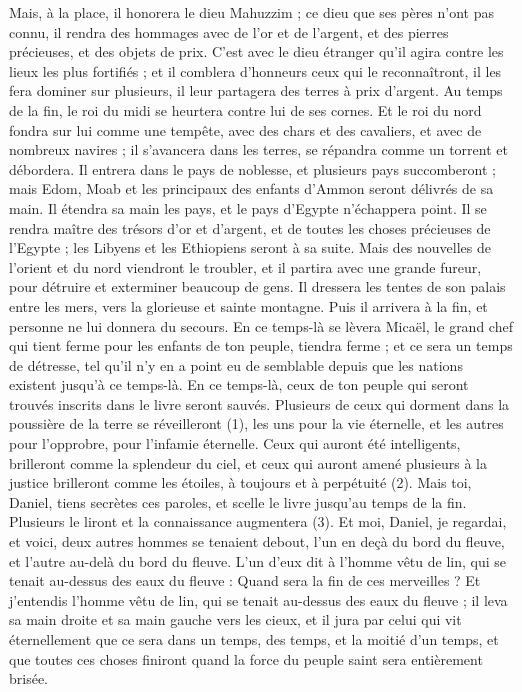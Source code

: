 \begin{multicols}{2}
Mais, à la place, il honorera le dieu Mahuzzim ; ce dieu que ses pères n'ont pas connu, il rendra des hommages avec de l'or et de l'argent, et des pierres précieuses, et des objets de prix.
C’est avec le dieu étranger qu’il agira contre les lieux les plus fortifiés ; et il comblera d’honneurs ceux qui le reconnaîtront, il les fera dominer sur plusieurs, il leur partagera des terres à prix d’argent.
Au temps de la fin, le roi du midi se heurtera contre lui de ses cornes. Et le roi du nord fondra sur lui comme une tempête, avec des chars et des cavaliers, et avec de nombreux navires ; il s’avancera dans les terres, se répandra comme un torrent et débordera.
Il entrera dans le pays de noblesse, et plusieurs pays succomberont ; mais Edom, Moab et les principaux des enfants d’Ammon seront délivrés de sa main.
Il étendra sa main les pays, et le pays d'Egypte n'échappera point.
Il se rendra maître des trésors d'or et d'argent, et de toutes les choses précieuses de l'Egypte ; les Libyens et les Ethiopiens seront à sa suite.
Mais des nouvelles de l'orient et du nord viendront le troubler, et il partira avec une grande fureur, pour détruire et exterminer beaucoup de gens.
Il dressera les tentes de son palais entre les mers, vers la glorieuse et sainte montagne. Puis il arrivera à la fin, et personne ne lui donnera du secours.
\VerseOne{}En ce temps-là se lèvera Micaël, le grand chef qui tient ferme pour les enfants de ton peuple, tiendra ferme ; et ce sera un temps de détresse, tel qu'il n'y en a point eu de semblable depuis que les nations existent jusqu’à ce temps-là. En ce temps-là, ceux de ton peuple qui seront trouvés inscrits dans le livre seront sauvés.
Plusieurs de ceux qui dorment dans la poussière de la terre se réveilleront (1), les uns pour la vie éternelle, et les autres pour l’opprobre, pour l'infamie éternelle.
Ceux qui auront été intelligents, brilleront comme la splendeur du ciel, et ceux qui auront amené plusieurs à la justice brilleront comme les étoiles, à toujours et à perpétuité (2).
Mais toi, Daniel, tiens secrètes ces paroles, et scelle le livre jusqu'au temps de la fin. Plusieurs le liront et la connaissance augmentera (3).
Et moi, Daniel, je regardai, et voici, deux autres hommes se tenaient debout, l'un en deçà du bord du fleuve, et l'autre au-delà du bord du fleuve.
L’un d’eux dit à l'homme vêtu de lin, qui se tenait au-dessus des eaux du fleuve : Quand sera la fin de ces merveilles ?
Et j'entendis l'homme vêtu de lin, qui se tenait au-dessus des eaux du fleuve ; il leva sa main droite et sa main gauche vers les cieux, et il jura par celui qui vit éternellement que ce sera dans un temps, des temps, et la moitié d’un temps,  et que toutes ces choses finiront quand la force du peuple saint sera entièrement brisée.

\end{multicols}
